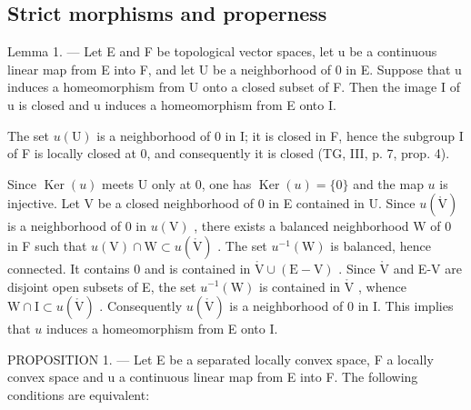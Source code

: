 \subsection{Strict morphisms and properness}

Lemma 1. --- Let E and F be topological vector spaces, let u be a continuous linear map from E into F, and let U be a neighborhood of 0 in E. Suppose that u induces a homeomorphism from U onto a closed subset of F. Then the image I of u is closed and u induces a homeomorphism from E onto I.

The set \(u(\mathrm{U})\) is a neighborhood of 0 in I; it is closed in F, hence the subgroup I of F is locally closed at 0, and consequently it is closed (TG, III, p. 7, prop. 4).

Since \(\operatorname{Ker}(u)\) meets U only at 0, one has \(\operatorname{Ker}(u) = \{0\}\) and the map \(u\) is injective. Let V be a closed neighborhood of 0 in E contained in U. Since \(u(\mathring{\mathrm{V}})\) is a neighborhood of 0 in \(u(\mathrm{V})\) , there exists a balanced neighborhood W of 0 in F such that \(u(\mathrm{V}) \cap \mathrm{W} \subset u(\mathring{\mathrm{V}})\) . The set \(u^{-1}(\mathrm{W})\) is balanced, hence connected. It contains 0 and is contained in \(\mathring{\mathrm{V}} \cup (\mathrm{E} - \mathrm{V})\) . Since \(\mathring{\mathrm{V}}\) and E-V are disjoint open subsets of E, the set \(u^{-1}(\mathrm{W})\) is contained in \(\mathring{\mathrm{V}}\) , whence \(\mathrm{W} \cap \mathrm{I} \subset u(\mathring{\mathrm{V}})\) . Consequently \(u(\mathring{\mathrm{V}})\) is a neighborhood of 0 in I. This implies that \(u\) induces a homeomorphism from E onto I.

PROPOSITION 1. --- Let E be a separated locally convex space, F a locally convex space and u a continuous linear map from E into F. The following conditions are equivalent:


